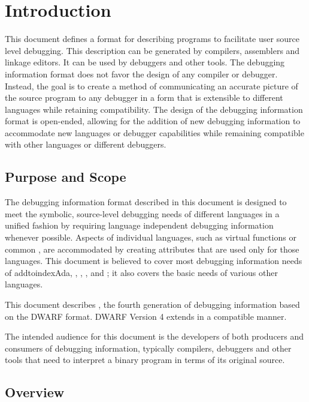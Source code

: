 \chapter{Introduction}
\label{chap:introduction}
This document defines a format for describing programs to
facilitate user source level debugging. This description
can be generated by compilers, assemblers and linkage
editors. 
It can be used by debuggers and other tools. 
The
debugging information format does not favor the design of any
compiler or debugger. 
Instead, the goal is to create a method
of communicating an accurate picture of the source program
to any debugger in a form that is extensible to different
languages while retaining compatibility.  
The design of the
debugging information format is open-ended, allowing for
the addition of new debugging information to accommodate new
languages or debugger capabilities while remaining compatible
with other languages or different debuggers.

\section{Purpose and Scope}
The debugging information format described in this document is
designed to meet the symbolic, source-level debugging needs of
different languages in a unified fashion by requiring language
independent debugging information whenever possible.  
Aspects
of individual languages, such as  virtual functions or
 common 
, are accommodated by creating attributes
that are used only for those languages. 
This document is
believed to cover most debugging information needs of 
addtoindex{Ada},
, , , 
and ; it also covers the basic needs
of various other languages.

This document describes ,
the fourth generation
of debugging information based on the DWARF format. DWARF
Version 4 extends 
in a compatible manner.

The intended audience for this document is the developers
of both producers and consumers of debugging information,
typically compilers, debuggers and other tools that need to
interpret a binary program in terms of its original source.

\section{Overview}


